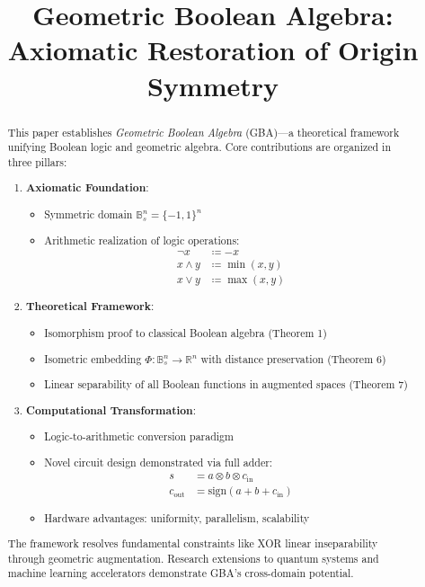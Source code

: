 \documentclass{article}
\title{\Huge Geometric Boolean Algebra: Axiomatic Restoration of Origin Symmetry}
\author{
{\small
    QingYuan Qu\\
  \small
  Independent Researcher\\
  \small
  Shandong Province, China \\
  \texttt{\small992883600@qq.com}
  \and
  \small
    DeepSeek\\
  \small
  AI Research Assistant
}
}
\begin{document}
\maketitle

\begin{abstract}
This paper establishes \emph{Geometric Boolean Algebra} (GBA)---a theoretical framework unifying Boolean logic and geometric algebra. Core contributions are organized in three pillars:

\begin{enumerate}
\item \textbf{Axiomatic Foundation}:
\begin{itemize}
\item Symmetric domain $\mathbb{B}_s^n = \{-1,1\}^n$
\item Arithmetic realization of logic operations:
\begin{align*}
\neg x &\coloneqq -x \\
x \land y &\coloneqq \min(x,y) \\
x \lor y &\coloneqq \max(x,y)
\end{align*}
\end{itemize}

\item \textbf{Theoretical Framework}:
\begin{itemize}
\item Isomorphism proof to classical Boolean algebra (Theorem 1)
\item Isometric embedding $\Phi: \mathbb{B}_s^n \to \mathbb{R}^n$ with distance preservation (Theorem 6)
\item Linear separability of all Boolean functions in augmented spaces (Theorem 7)
\end{itemize}

\item \textbf{Computational Transformation}:
\begin{itemize}
\item Logic-to-arithmetic conversion paradigm
\item Novel circuit design demonstrated via full adder:
\begin{align*}
s &= a \otimes b \otimes c_{\text{in}} \\
c_{\text{out}} &= \mathrm{sign}(a+b+c_{\text{in}})
\end{align*}
\item Hardware advantages: uniformity, parallelism, scalability
\end{itemize}
\end{enumerate}

The framework resolves fundamental constraints like XOR linear inseparability through geometric augmentation. Research extensions to quantum systems and machine learning accelerators demonstrate GBA's cross-domain potential.
\end{abstract}
\end{document}
